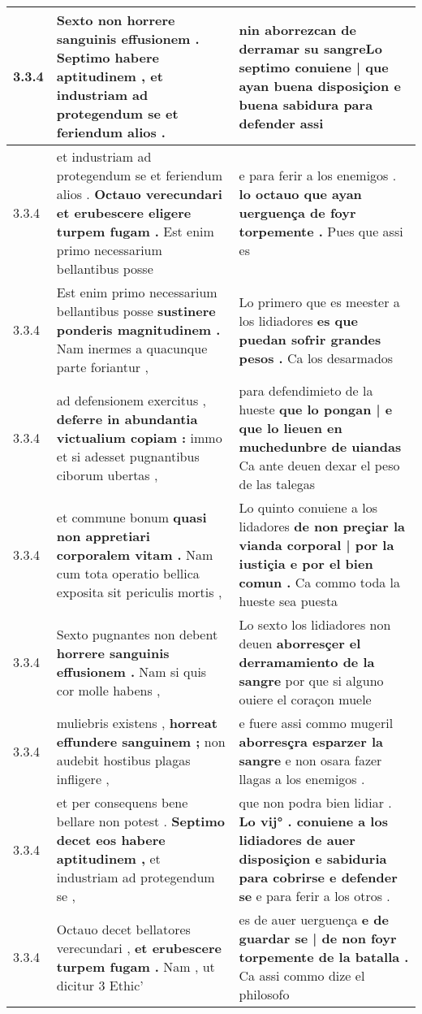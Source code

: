 \begin{tabular}{|p{1cm}|p{6.5cm}|p{6.5cm}|}
3.3.4 & Sexto non horrere sanguinis effusionem . \textbf{ Septimo habere aptitudinem , } et industriam ad protegendum se et feriendum alios . & nin aborrezcan de derramar su \textbf{ sangreLo septimo conuiene | que ayan buena disposiçion e buena sabidura } para defender assi \\\hline
3.3.4 & et industriam ad protegendum se et feriendum alios . \textbf{ Octauo verecundari et erubescere eligere turpem fugam . } Est enim primo necessarium bellantibus posse & e para ferir a los enemigos . \textbf{ lo octauo que ayan uerguença de foyr torpemente . } Pues que assi es \\\hline
3.3.4 & Est enim primo necessarium bellantibus posse \textbf{ sustinere ponderis magnitudinem . } Nam inermes a quacunque parte foriantur , & Lo primero que es meester a los lidiadores \textbf{ es que puedan sofrir grandes pesos . } Ca los desarmados \\\hline
3.3.4 & ad defensionem exercitus , \textbf{ deferre in abundantia victualium copiam : } immo et si adesset pugnantibus ciborum ubertas , & para defendimieto de la hueste \textbf{ que lo pongan | e que lo lieuen en muchedunbre de uiandas } Ca ante deuen dexar el peso de las talegas \\\hline
3.3.4 & et commune bonum \textbf{ quasi non appretiari corporalem vitam . } Nam cum tota operatio bellica exposita sit periculis mortis , & Lo quinto conuiene a los lidadores \textbf{ de non preçiar la vianda corporal | por la iustiçia e por el bien comun . } Ca commo toda la hueste sea puesta \\\hline
3.3.4 & Sexto pugnantes non debent \textbf{ horrere sanguinis effusionem . } Nam si quis cor molle habens , & Lo sexto los lidiadores non deuen \textbf{ aborresçer el derramamiento de la sangre } por que si alguno ouiere el coraçon muele \\\hline
3.3.4 & muliebris existens , \textbf{ horreat effundere sanguinem ; } non audebit hostibus plagas infligere , & e fuere assi commo mugeril \textbf{ aborresçra esparzer la sangre } e non osara fazer llagas a los enemigos . \\\hline
3.3.4 & et per consequens bene bellare non potest . \textbf{ Septimo decet eos habere aptitudinem , } et industriam ad protegendum se , & que non podra bien lidiar . \textbf{ Lo vij° . conuiene a los lidiadores de auer disposiçion e sabiduria para cobrirse e defender se } e para ferir a los otros . \\\hline
3.3.4 & Octauo decet bellatores verecundari , \textbf{ et erubescere turpem fugam . } Nam , ut dicitur 3 Ethic’ & es de auer uerguença \textbf{ e de guardar se | de non foyr torpemente de la batalla . } Ca assi commo dize el philosofo \\\hline

\end{tabular}
